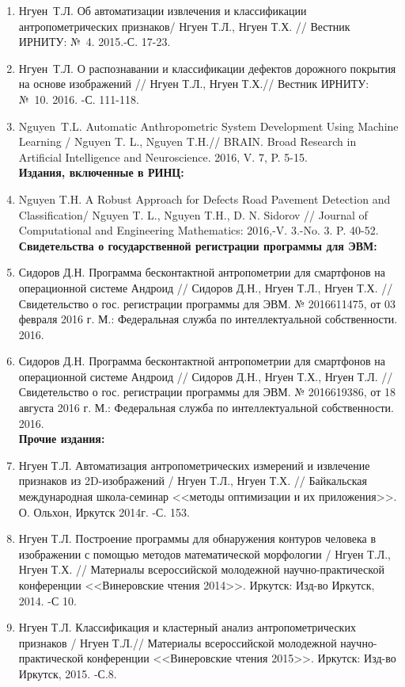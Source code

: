 \begin{enumerate}
	\item Нгуен~Т.Л. Об автоматизации извлечения и классификации антропометрических признаков/ Нгуен Т.Л., Нгуен Т.Х. // Вестник ИРНИТУ: №~4. 2015.-С. 17-23.
	\item Нгуен~Т.Л. О распознавании и классификации дефектов дорожного покрытия на основе изображений // Нгуен Т.Л., Нгуен Т.Х.// Вестник ИРНИТУ: №~10. 2016. -С. 111-118.
	\item Nguyen~T.L. Automatic Anthropometric System Development Using Machine Learning / Nguyen T. L., Nguyen T.H.// BRAIN. Broad Research in Artificial Intelligence and Neuroscience. 2016, V. 7, P. 5-15.\\
	\textbf{Издания, включенные в РИНЦ:}
	\item Nguyen T.H. A Robust Approach for Defects Road Pavement Detection and Classification/ Nguyen T. L., Nguyen T.H., D. N. Sidorov // Journal of Computational and Engineering Mathematics: 2016,-V. 3.-No. 3. P. 40-52.\\
	\textbf{Свидетельства о государственной регистрации программы для ЭВМ:}
	\item  Сидоров Д.Н. Программа бесконтактной антропометрии для смартфонов на операционной системе Андроид // Сидоров Д.Н., Нгуен Т.Л., Нгуен Т.Х. // Свидетельство о гос. регистрации программы для ЭВМ. № 2016611475, от 03 февраля 2016 г. М.: Федеральная служба по интеллектуальной собственности. 2016.
	\item  Сидоров Д.Н. Программа бесконтактной антропометрии для смартфонов на операционной системе Андроид // Сидоров Д.Н.,  Нгуен Т.Х., Нгуен Т.Л. // Свидетельство о гос. регистрации программы для ЭВМ. № 2016619386, от 18 августа  2016 г. М.: Федеральная служба по интеллектуальной собственности. 2016.\\
\textbf{Прочие издания:}
\item  Нгуен Т.Л. Автоматизация антропометрических измерений и извлечение признаков из 2D-изображений / Нгуен Т.Л., Нгуен Т.Х. // Байкальская международная школа-семинар <<методы оптимизации и их приложения>>. О. Ольхон, Иркутск 2014г. -С. 153.
\item Нгуен Т.Л. Построение программы для обнаружения контуров человека в изображении с помощью методов математической морфологии / Нгуен Т.Л., Нгуен Т.Х. // Материалы всероссийской молодежной научно-практической конференции <<Винеровские чтения 2014>>. Иркутск: Изд-во Иркутск, 2014. -С 10.
\item Нгуен Т.Л. Классификация и кластерный анализ антропометрических признаков / Нгуен Т.Л.// Материалы всероссийской молодежной научно-практической конференции <<Винеровские чтения 2015>>. Иркутск: Изд-во Иркутск, 2015. -С.8.

\end{enumerate}
